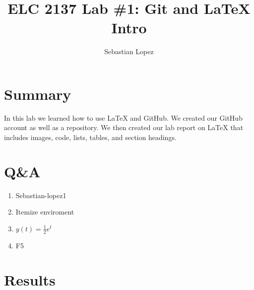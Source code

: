 \documentclass[11pt]{article}
\begin{document}
\title{ELC 2137 Lab \#1: Git and LaTeX Intro}
\author{Sebastian Lopez}

\maketitle


\section*{Summary}

In this lab we learned how to use LaTeX and GitHub. We created our GitHub account as well as a repository. We then created our lab report on LaTeX that includes images, code, lists, tables, and section headings.

\section*{Q\&A}

\begin{enumerate}
	\item Sebastian-lopez1
	\item Itemize enviroment 
	\item $y(t) = \frac{1}{2} e^t$
	\item F5
\end{enumerate}

\section*{Results}
\end{document}

